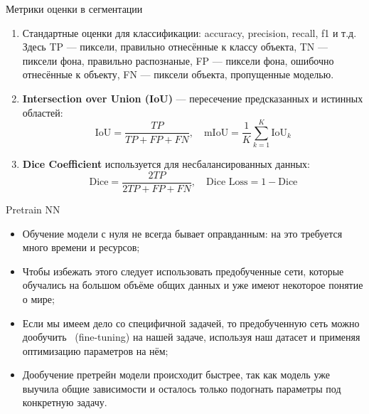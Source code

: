 \documentclass[notheorems, handout]{beamer}
\begin{document}
\begin{frame}{Метрики оценки в сегментации}
    \begin{enumerate}
        \item Стандартные оценки для классификации: accuracy, precision, recall, f1 и т.д. Здесь TP --- пиксели, правильно отнесённые к классу объекта, TN --- пиксели фона, правильно распознаные, FP --- пиксели фона, ошибочно отнесённые к объекту, FN --- пиксели объекта, пропущенные моделью.
        \item \textbf{Intersection over Union (IoU)} --- пересечение предсказанных и истинных областей:
        \[
            \text{IoU} = \frac{TP}{TP + FP + FN}, \quad
            \text{mIoU} = \frac{1}{K} \sum_{k=1}^{K} \text{IoU}_k
        \]
        \item \textbf{Dice Coefficient} используется для несбалансированных данных:
        \[
            \text{Dice} = \frac {2TP} {2TP + FP + FN}, \quad
            \text{Dice Loss} = 1 - \text{Dice}
        \]
    \end{enumerate}
\end{frame}

\begin{frame}{Pretrain NN}
    \begin{itemize}
        \item Обучение модели с нуля не всегда бывает оправданным: на это требуется много времени и ресурсов;
        \item Чтобы избежать этого следует использовать предобученные сети, которые обучались на большом объёме общих данных и уже имеют некоторое понятие \glqq о мире\grqq;
        \item Если мы имеем дело со специфичной задачей, то предобученную сеть можно \glqq дообучить\grqq~ (fine-tuning) на нашей задаче, используя наш датасет и применяя оптимизацию параметров на нём;
        \item Дообучение претрейн модели происходит быстрее, так как модель уже выучила общие зависимости и осталось только подогнать параметры под конкретную задачу.
    \end{itemize}
\end{frame}
\end{document}
